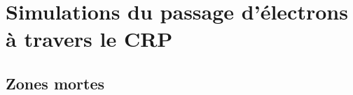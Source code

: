        {
       	\setlength\pdfpagewidth{12.8cm}%
       	\setlength\pdfpageheight{11.5cm}%
       \begin{frame}[plain]
       	
       \end{frame}
	    }

    \section[Simulations]{Simulations du passage d'électrons à travers le CRP}
      \subsection{Zones mortes}
    

